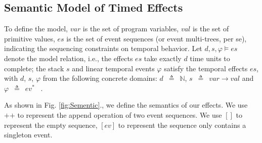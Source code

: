 \documentclass[acmsmall,10pt,review]{acmart}
\newcommand{\code}[1]{{\tt{\ensuremath{\m{#1}}}}}
\newcommand{\m}{\mathit}
\newcommand{\lappend}{\mathrel{\texttt{++}}}
\def\defeq{\ensuremath{\,\triangleq}}
\newcommand\figref[1]{Fig. \textcolor{black}{\ref{#1}}.}
\begin{document}
{\subsection{Semantic Model of Timed Effects}
\label{subsec:Specification_Semantics}


To define the model, 
\code{var} is the set of program variables, 
\code{val} is the set of primitive values, 
\code{es} is the set of event sequences (or event multi-trees, per se), indicating the sequencing constraints on temporal behavior.
Let \code{d, s, \varphi \models es} denote the model relation, i.e., 
the effects \code{es} take exactly \code{d} time units to complete; 
the stack \code{s} and linear temporal events \code{\varphi} satisfy the 
temporal effects \code{es}, with \code{d}, \code{s}, \code{\varphi} 
from the following concrete domains: \code{d}  {\defeq}\  \code{\mathbb{N}}, 
\code{s}  \defeq\  \code{var {\rightarrow} val } and \code{\varphi}   \defeq\ \code{ev^*} \ .

As shown in \figref{fig:Sementic}, we define the semantics of our effects. 
We use $\lappend$ to represent the append operation of two event sequences. 
We use $[]$ to represent the empty sequence, \code{[ev]} to represent 
the sequence only contains a singleton event. 

}
\end{document}
